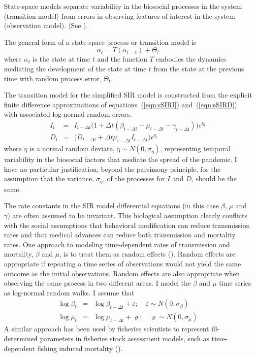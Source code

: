 \documentclass[12pt,letterpaper]{article}
\begin{document}
State-space models separate variability in the biosocial
processes in the system (transition model)
from errors in observing features of interest
in the system (observation model).
(See \cite{Harvey1990}).

The general form of a state-space process or transition model is
\begin{equation}
\alpha_t=T(\alpha_{t-1}) + \Theta_t
\end{equation}
where $\alpha_t$ is the state at time $t$ and 
the function $T$ embodies the dynamics mediating the
development of the state at time $t$ from the state at the previous
time with random process error, $\Theta_t$.

The transition model for the simplified SIR model is constructed from
the explicit finite difference
approximations of equations~(\ref{eqn:sSIRI}) and~(\ref{eqn:sSIRD}) 
with associated log-normal
random errors.
\begin{eqnarray}
\label{eqn:sSIRfdI}
I_t &=& I_{t-\Delta t}\big(1+\Delta t(\beta_{t-\Delta t} - \mu_{t-\Delta t}
- \gamma_{t-\Delta t})\big)e^{\eta_t}\\
\label{eqn:sSIRfdD}
D_t &=& \big(D_{t-\Delta t} + \Delta t \mu_{t-\Delta t}I_{t-\Delta
t}\big)e^{\eta_t}
\end{eqnarray}
where $\eta$ is a normal random deviate, $\eta\sim
N(0,\sigma_\eta)$, representing temporal variability in the biosocial
factors that mediate the spread of the pandemic. 
I have no particular justification, beyond the parsimony principle,
for the assumption that the variance, $\sigma_\eta$, of the processes
for $I$ and $D$, should be the same.

The rate constants in the SIR model differential equations (in this
case $\beta$, $\mu$ and $\gamma$) are often assumed to be invariant.
This biological assumption clearly conflicts with the social
assumptions
that behavioral modification can reduce transmission rates and
that medical advances can reduce both transmission and mortality
rates.
One approach to modeling time-dependent rates of transmission and
mortality, $\beta$ and $\mu$, is to treat them as random effects
(\cite{Skaug2006}). Random effects are appropriate if repeating a time
series of observations would not yield the same outcome as the initial
observations. Random effects are also appropriate when observing
the same process in two different areas. I model the  $\beta$ and
$\mu$ time series as log-normal random walks. I assume that
\begin{eqnarray}
\log\beta_t &=& \log\beta_{t-\Delta t}+\varepsilon;\quad \varepsilon\sim 
N(0,\sigma_\beta)\\
\log\mu_t &=& \log\mu_{t-\Delta t}+\varrho;\quad \varrho\sim
N(0,\sigma_\mu)
\end{eqnarray}
A similar approach has been used by fisheries scientists to represent
ill-determined parameters in fisheries stock assessment models, such
as time-dependent fishing induced mortality
(\cite{Nielsen2014b,Sibert2017}).
\end{document}

